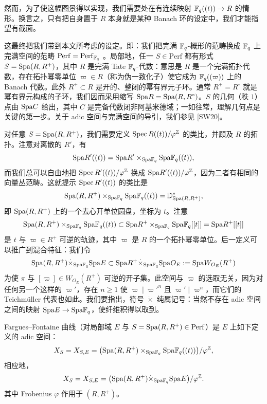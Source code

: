 然而，为了使这幅图景得以实现，我们需要处在有连续映射 $\mathbb{F}_q((t))\to R$ 的情形。换言之，只有把自身置于 $R$ 本身就是某种 Banach 环的设定中，我们才能指望有截面。

这最终把我们带到本文所考虑的设定。即：我们把完满 $\mathbb{F}_q$-概形的范畴换成 $\mathbb{F}_q$ 上完满空间的范畴 $\mathrm{Perf}=\mathrm{Perf}_{\mathbb{F}_q}$
。局部地，任一 $S\in\mathrm{Perf}$ 都有形式 $S=\mathrm{Spa}(R,R^+)$，其中 $R$ 是完满 Tate $\mathbb{F}_q$-代数：意思是 $R$ 是一个完满拓扑代数，存在拓扑幂零单位 $\varpi\in R$（称为伪一致化子）使它成为 $\mathbb{F}_q((\varpi))$ 上的 Banach 代数。此外 $R^+\subset R$ 是开的、整闭的幂有界元子环。通常 $R^+=R^\circ$ 就是幂有界元构成的子环，我们因而采用缩写 $\mathrm{Spa} R=\mathrm{Spa}(R,R^\circ)$。$S$ 的几何（秩 $1$）点由 $\mathrm{Spa} C$ 给出，其中 $C$ 是完备代数闭非阿基米德域；一如往常，理解几何点是关键的第一步。关于 adic 空间与完满空间的导引，我们参见 [SW20]。

对任意 $S=\mathrm{Spa}(R,R^+)$，我们需要定义 $\operatorname{Spec} R((t))/\varphi^{\mathbb{Z}}$ 的类比，并顾及 $R$ 的拓扑。注意对离散的 $R'$，有
\[
  \mathrm{Spa} R'((t)) = \mathrm{Spa} R'\times_{\mathrm{Spa}\mathbb{F}_q}\mathrm{Spa}\mathbb{F}_q((t)),
\]
而我们总可以自由地把 $\operatorname{Spec} R'((t))/\varphi^{\mathbb{Z}}$ 换成 $\mathrm{Spa} R'((t))/\varphi^{\mathbb{Z}}$，因为二者有相同的向量丛范畴。这就提示 $\operatorname{Spec} R'((t))$ 的类比是
\[
  \mathrm{Spa}(R,R^+)\times_{\mathrm{Spa}\mathbb{F}_q}\mathrm{Spa}\mathbb{F}_q((t)) = \mathbb{D}^*_{\mathrm{Spa}(R,R^+)},
\]
即 $\mathrm{Spa}(R,R^+)$ 上的一个去心开单位圆盘，坐标为 $t$。注意
\[
  \mathrm{Spa}(R,R^+)\times_{\mathrm{Spa}\mathbb{F}_q}\mathrm{Spa}\mathbb{F}_q((t)) \subset \mathrm{Spa} R^+\times_{\mathrm{Spa}\mathbb{F}_q}\mathrm{Spa}\mathbb{F}_q[[t]] = \mathrm{Spa} R^+[[t]]
\]
是 $t$ 与 $\varpi\in R^+$ 可逆的轨迹，其中 $\varpi$ 是 $R$ 的一个拓扑幂零单位。后一定义可以推广到混合特征：我们令
\[
  \mathrm{Spa}(R,R^+)\dot\times_{\mathrm{Spa}\mathbb{F}_q}\mathrm{Spa} E \subset \mathrm{Spa} R^+\dot\times_{\mathrm{Spa}\mathbb{F}_q}\mathrm{Spa} O_E := \mathrm{Spa} W_{O_E}(R^+)
\]
为使 $\pi$ 与 $[\varpi]\in W_{O_E}(R^+)$ 可逆的开子集。此空间与 $\varpi$ 的选取无关，因为对任何另一个这样的 $\varpi'$，存在 $n\ge1$ 使 $\varpi\mid\varpi'^n$ 且 $\varpi'\mid\varpi^n$，而它们的 Teichmüller 代表也如此。我们要指出，符号 $\dot\times$ 纯属记号：当然不存在 adic 空间之间的映射 $\mathrm{Spa} E\to\mathrm{Spa}\mathbb{F}_q$，使纤维积得以取到。

\begin{definition}%
Fargues–Fontaine 曲线（对局部域 $E$ 与 $S=\mathrm{Spa}(R,R^+)\in\mathrm{Perf}$）是 $E$ 上如下定义的 adic 空间：
\[
  X_S = X_{S,E} = \bigl(\mathrm{Spa}(R,R^+)\times_{\mathrm{Spa}\mathbb{F}_q}\mathrm{Spa}\mathbb{F}_q((t))\bigr)/\varphi^{\mathbb{Z}},
\]
相应地，
\[
  X_S = X_{S,E} = \bigl(\mathrm{Spa}(R,R^+)\dot\times_{\mathrm{Spa}\mathbb{F}_q}\mathrm{Spa} E\bigr)/\varphi^{\mathbb{Z}}.
\]
\leavevmode{}其中 Frobenius $\varphi$ 作用于 $(R,R^+)$。
\end{definition}

